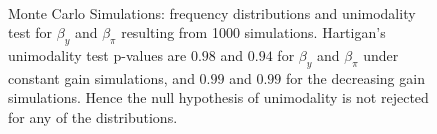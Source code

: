     \begin{figure}
    \mbox{
 }\\

  \caption{ Monte Carlo Simulations: frequency distributions and unimodality test for $\beta_y$ and $\beta_{\pi}$ resulting from 1000 simulations. Hartigan's unimodality test p-values are $ 0.98$ and $0.94$ for $\beta_y$ and $\beta_{\pi}$  under constant gain simulations, and $ 0.99$ and $0.99$ for the decreasing gain simulations. Hence the null hypothesis of unimodality is not rejected for any of the distributions.
   }
  \label{nkm_sac_MC}
\end{figure}

